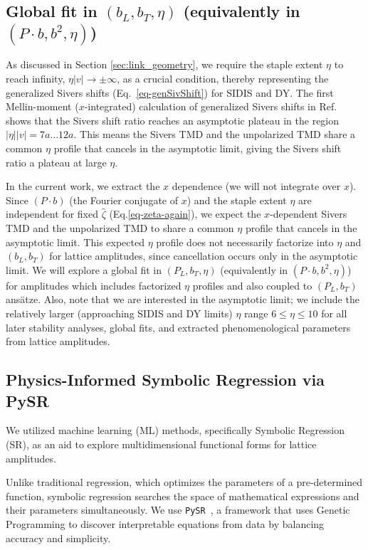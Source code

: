 \subsection{Global fit in \texorpdfstring{$(b_L,b_T,\eta)$}{(bL, bT, eta)} (equivalently in \texorpdfstring{$(P\cdot b,b^2,\eta)$}{(P.b, b2, eta)})}
\label{global-bLbTeta-fit}
As discussed in Section \ref{sec:link_geometry}, we require the staple extent $\eta$ to reach infinity, $\eta|v|\rightarrow\pm\infty$, as a crucial condition, thereby representing the generalized Sivers shifts (Eq.~\eqref{eq-genSivShift}) for SIDIS and DY. The first Mellin-moment ($x$-integrated) calculation of generalized Sivers shifts in Ref.~\cite{Musch:2011er} shows that the Sivers shift ratio reaches an asymptotic plateau in the region $|\eta| |v|=7a \ldots 12a$. This means the Sivers TMD and the unpolarized TMD share a common $\eta$ profile that cancels in the asymptotic limit, giving the Sivers shift ratio a plateau at large $\eta$.

In the current work, we extract the $x$ dependence (we will not integrate over $x$). Since $(P\cdot b)$ (the Fourier conjugate of $x$) and the staple extent $\eta$ are independent for fixed $\hat{\zeta}$ (Eq.\eqref{eq-zeta-again}), we expect the $x$-dependent Sivers TMD and the unpolarized TMD to share a common $\eta$ profile that cancels in the asymptotic limit. This expected $\eta$ profile does not necessarily factorize into $\eta$ and $(b_L,b_T)$ for lattice amplitudes, since cancellation occurs only in the asymptotic limit. We will explore a global fit in $(P_L,b_T,\eta)$ (equivalently in $(P\cdot b,b^2,\eta)$) for amplitudes which includes factorized $\eta$ profiles and also coupled to $(P_L,b_T)$ ansätze. Also, note that we are interested in the asymptotic limit; we include the relatively larger (approaching SIDIS and DY limits) $\eta$ range $6\leq\eta\leq10$ for all later stability analyses, global fits, and extracted phenomenological parameters from lattice amplitudes.  


\subsection{Physics-Informed Symbolic Regression via PySR}
\label{sec:pysr_methodology}

We utilized machine learning (ML) methods, specifically Symbolic Regression (SR), as an aid to explore multidimensional functional forms for lattice amplitudes.

Unlike traditional regression, which optimizes the parameters of a pre-determined function, symbolic regression searches the space of mathematical expressions and their parameters simultaneously. We use \texttt{PySR}~\cite{Cranmer2023pysr}, a framework that uses Genetic Programming to discover interpretable equations from data by balancing accuracy and simplicity.

